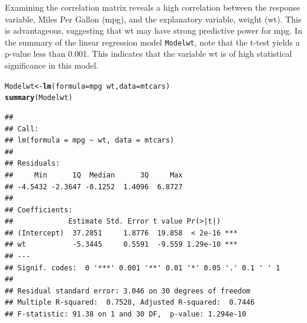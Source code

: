 \documentclass{article}\usepackage[]{graphicx}\usepackage[]{xcolor}
\makeatletter
\newcommand{\hlopt}[1]{\textcolor[rgb]{0,0,0}{#1}}%
\newcommand{\hlstd}[1]{\textcolor[rgb]{0.345,0.345,0.345}{#1}}%
\newcommand{\hlkwb}[1]{\textcolor[rgb]{0.69,0.353,0.396}{#1}}%
\newcommand{\hlkwc}[1]{\textcolor[rgb]{0.333,0.667,0.333}{#1}}%
\newcommand{\hlkwd}[1]{\textcolor[rgb]{0.737,0.353,0.396}{\textbf{#1}}}%
\newenvironment{kframe}{%
 \def\at@end@of@kframe{}%
 \ifinner\ifhmode%
  \def\at@end@of@kframe{\end{minipage}}%
  \begin{minipage}{\columnwidth}%
 \fi\fi%
 \def\FrameCommand##1{\hskip\@totalleftmargin \hskip-\fboxsep
 \colorbox{shadecolor}{##1}\hskip-\fboxsep
     \hskip-\linewidth \hskip-\@totalleftmargin \hskip\columnwidth}%
 \MakeFramed {\advance\hsize-\width
   \@totalleftmargin\z@ \linewidth\hsize
   \@setminipage}}%
 {\par\unskip\endMakeFramed%
 \at@end@of@kframe}
\newenvironment{knitrout}{}{} %
\makeatother
\begin{document}
\noindent
Examining the correlation matrix reveals a high correlation between the response variable, Miles Per Gallon (mpg), and the explanatory variable, weight (wt). This is advantageous, suggesting that wt may have strong predictive power for mpg. In the summary of the linear regression model \texttt{Modelwt}, note that the t-test yields a p-value less than 0.001. This indicates that the variable wt is of high statistical significance in this model.\\
\begin{knitrout}\scriptsize
{}\color{fgcolor}\begin{kframe}
\begin{alltt}
\hlstd{Modelwt} \hlkwb{<-} \hlkwd{lm}\hlstd{(}\hlkwc{formula} \hlstd{= mpg} \hlopt{~} \hlstd{wt,} \hlkwc{data} \hlstd{= mtcars)}
\hlkwd{summary}\hlstd{(Modelwt)}
\end{alltt}
\begin{verbatim}
## 
## Call:
## lm(formula = mpg ~ wt, data = mtcars)
## 
## Residuals:
##     Min      1Q  Median      3Q     Max 
## -4.5432 -2.3647 -0.1252  1.4096  6.8727 
## 
## Coefficients:
##             Estimate Std. Error t value Pr(>|t|)    
## (Intercept)  37.2851     1.8776  19.858  < 2e-16 ***
## wt           -5.3445     0.5591  -9.559 1.29e-10 ***
## ---
## Signif. codes:  0 '***' 0.001 '**' 0.01 '*' 0.05 '.' 0.1 ' ' 1
## 
## Residual standard error: 3.046 on 30 degrees of freedom
## Multiple R-squared:  0.7528,	Adjusted R-squared:  0.7446 
## F-statistic: 91.38 on 1 and 30 DF,  p-value: 1.294e-10
\end{verbatim}
\end{kframe}
\end{knitrout}
\end{document}
